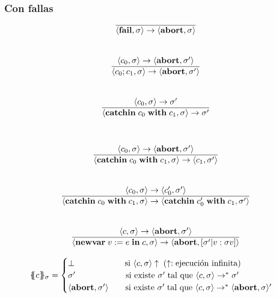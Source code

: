   \subsubsection*{Con fallas}
    \begin{multicols}{2}
      \[\begin{array}{cll}
        \overline{\lang{\fail, \sigma} \rightarrow \lang{\abort, \sigma}} \\ \\ \\

        \lang{c_0, \sigma} \rightarrow \lang{\abort, \sigma'} \\
        \overline{\lang{c_0;c_1, \sigma} \rightarrow \lang{\abort, \sigma'}} \\ \\ \\

        \lang{c_0, \sigma} \rightarrow \sigma' \\
        \overline{\lang{\catch{c_0}{c_1}, \sigma} \rightarrow \sigma'} \\ \\ \\
      \end{array}\]
      \[\begin{array}{cll}
        \langle c_0, \sigma\rangle \rightarrow \langle\textbf{abort}, \sigma'\rangle \\
        \overline{\langle\textbf{catchin}\;c_0\;\textbf{with}\;c_1, \sigma\rangle \rightarrow \langle c_1, \sigma'\rangle} \\ \\ \\
        \langle c_0, \sigma\rangle \rightarrow \langle c'_0, \sigma'\rangle \\
        \overline{\langle\textbf{catchin}\;c_0\;\textbf{with}\;c_1, \sigma\rangle \rightarrow \langle\textbf{catchin}\;c'_0\;\textbf{with}\;c_1, \sigma'\rangle} \\ \\ \\

        \langle c, \sigma\rangle \rightarrow \langle\textbf{abort}, \sigma'\rangle \\
        \overline{\langle\textbf{newvar}\;v := e\;\textbf{in}\;c, \sigma\rangle \rightarrow \langle\textbf{abort}, [\sigma' | v : \sigma v]\rangle}
      \end{array}\]
    \end{multicols}

    \begin{eqnarray*}
      \{\!\!\{c\}\!\!\}_{\sigma} = \begin{cases}
        \bot \qquad\qquad\qquad  \text{si } \langle c, \sigma\rangle \uparrow \; (\uparrow: \text{ejecución infinita}) \\
        \sigma' \qquad\qquad\qquad \text{si existe } \sigma' \; \text{tal que } \langle c, \sigma\rangle \rightarrow^{\ast} \sigma' \\
        \langle\textbf{abort}, \sigma'\rangle \qquad \text{si existe } \sigma' \; \text{tal que } \langle c, \sigma\rangle \rightarrow^{\ast} \langle\textbf{abort}, \sigma\rangle'
      \end{cases}
    \end{eqnarray*}

